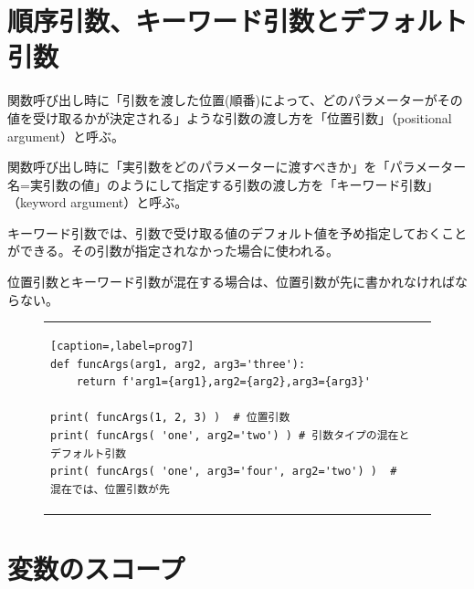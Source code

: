 \documentclass[uplatex,a4paper,11pt,oneside,openany]{jsbook}
\begin{document}
\section{順序引数、キーワード引数とデフォルト引数}

関数呼び出し時に「引数を渡した位置(順番)によって、どのパラメーターがその値を受け取るかが決定される」ような引数の渡し方を「位置引数」（positional argument）と呼ぶ。

関数呼び出し時に「実引数をどのパラメーターに渡すべきか」を「パラメーター名=実引数の値」のようにして指定する引数の渡し方を「キーワード引数」（keyword argument）と呼ぶ。

キーワード引数では、引数で受け取る値のデフォルト値を予め指定しておくことができる。その引数が指定されなかった場合に使われる。

位置引数とキーワード引数が混在する場合は、位置引数が先に書かれなければならない。

\begin{figure}[htpb]
  \centering
  \begin{tabular}{ll}
      \begin{minipage}{0.9\hsize}
      \centering
\begin{lstlisting}[caption=,label=prog7]
def funcArgs(arg1, arg2, arg3='three'):
    return f'arg1={arg1},arg2={arg2},arg3={arg3}'

print( funcArgs(1, 2, 3) )  # 位置引数
print( funcArgs( 'one', arg2='two') ) # 引数タイプの混在とデフォルト引数
print( funcArgs( 'one', arg3='four', arg2='two') )  # 混在では、位置引数が先
\end{lstlisting}%
      \end{minipage}
      \begin{minipage}{0.10\hsize}
      \centering

      \end{minipage}
    \end{tabular}
\end{figure}%

\section{変数のスコープ}
\end{document}
